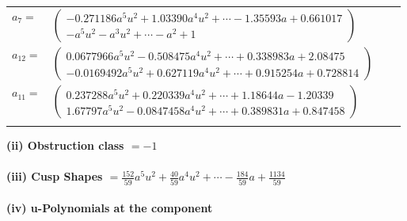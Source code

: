 \documentclass[1p]{elsarticle_modified}
\theoremstyle{definition}
\begin{document}
\begin{tabular}{m{7pt} m{180pt} m{7pt} m{180pt} }
\flushright $a_{7}=$&$\begin{pmatrix}-0.271186 a^{5} u^{2}+1.03390 a^{4} u^{2}+\cdots-1.35593 a+0.661017\\- a^5 u^2- a^3 u^2+\cdots- a^2+1\end{pmatrix}$ \\
\flushright $a_{12}=$&$\begin{pmatrix}0.0677966 a^{5} u^{2}-0.508475 a^{4} u^{2}+\cdots+0.338983 a+2.08475\\-0.0169492 a^{5} u^{2}+0.627119 a^{4} u^{2}+\cdots+0.915254 a+0.728814\end{pmatrix}$ \\
\flushright $a_{11}=$&$\begin{pmatrix}0.237288 a^{5} u^{2}+0.220339 a^{4} u^{2}+\cdots+1.18644 a-1.20339\\1.67797 a^{5} u^{2}-0.0847458 a^{4} u^{2}+\cdots+0.389831 a+0.847458\end{pmatrix}$\\&\end{tabular}
\flushleft \textbf{(ii) Obstruction class $= -1$}\\~\\
\flushleft \textbf{(iii) Cusp Shapes $= \frac{152}{59} a^5 u^2+\frac{40}{59} a^4 u^2+\cdots-\frac{184}{59} a+\frac{1134}{59}$}\\~\\
\newpage\renewcommand{\arraystretch}{1}
\flushleft \textbf{(iv) u-Polynomials at the component}\newline \\
\end{document}
